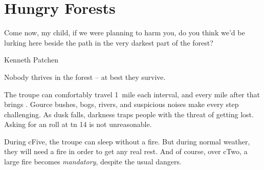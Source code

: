 \chapter{Hungry Forests}
\epigraph{Come now, my child, if we were planning to harm you, do you think we'd be lurking here beside the path in the very darkest part of the forest?}{Kenneth Patchen}

\noindent
Nobody thrives in the forest -- at best they survive.

The troupe can comfortably travel 1~mile each \gls{interval}, and every mile after that brings .%
Gource bushes, bogs, rivers, and suspicious noises make every step challenging.
As dusk falls, darkness traps people with the threat of getting lost.
Asking for an  roll at \gls{tn} 14 is not unreasonable.

During \gls{cFive}, the troupe can sleep without a fire.
But during normal weather, they will need a fire in order to get any real rest.
And of course, over \gls{cTwo}, a large fire becomes \emph{mandatory}, despite the usual dangers.%
